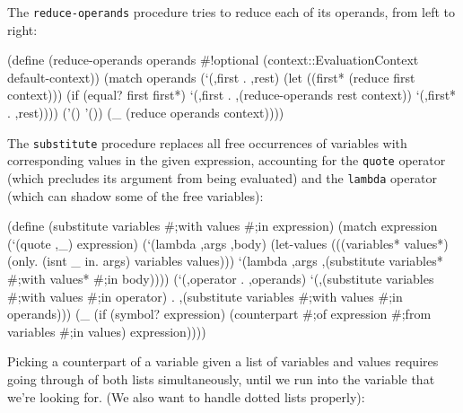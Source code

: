 \documentclass[acmsmall]{acmart}
\newenvironment{Snippet}{\Verbatim[samepage=true]}{\endVerbatim}
\begin{document}
The \texttt{reduce-operands} procedure tries to reduce each of its
operands, from left to right:


\begin{Snippet}
(define (reduce-operands operands #!optional (context::EvaluationContext 
                                                         default-context))
  (match operands
    (`(,first . ,rest)
     (let ((first* (reduce first context)))
       (if (equal? first first*)
	   `(,first . ,(reduce-operands rest context))
	   `(,first* . ,rest))))
\end{Snippet}
\begin{Snippet}
    ('()
     '())
\end{Snippet}
\begin{Snippet}
    (_
     (reduce operands context))))
\end{Snippet}

The \texttt{substitute} procedure replaces all free occurrences of variables
with corresponding values in the given expression, accounting for
the \texttt{quote} operator (which precludes its argument from being evaluated)
and the \texttt{lambda} operator (which can shadow some of the free variables):

\begin{Snippet}
(define (substitute variables #;with values #;in expression)
  (match expression
\end{Snippet}
\begin{Snippet}
    (`(quote ,_)
     expression)
\end{Snippet}
\begin{Snippet}
    (`(lambda ,args ,body)
     (let-values (((variables* values*) (only. (isnt _ in. args) variables values)))
       `(lambda ,args
	  ,(substitute variables* #;with values* #;in body))))
\end{Snippet}
\begin{Snippet}
    (`(,operator . ,operands)
     `(,(substitute variables #;with values #;in operator)
       . ,(substitute variables #;with values #;in operands)))
\end{Snippet}
\begin{Snippet}
    (_
     (if (symbol? expression)
	 (counterpart #;of expression #;from variables #;in values)
	 expression))))
\end{Snippet}

Picking a counterpart of a variable given a list of variables
and values requires going through of both lists simultaneously,
until we run into the variable that we're looking for. (We also
want to handle dotted lists properly):
\end{document}
